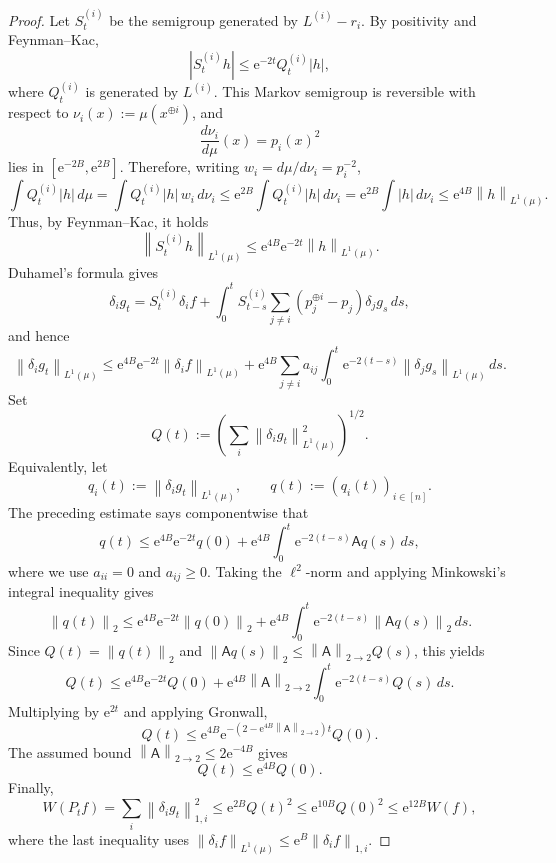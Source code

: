 \documentclass[11pt]{article}
\theoremstyle{plain}
\theoremstyle{definition}
\theoremstyle{remark}
\newcommand{\norm}[1]{\left\lVert #1 \right\rVert}
\newcommand{\e}{\mathrm{e}}
\newcommand{\tuple}[1]{\left(#1\right)}
\newcommand{\tp}{\tuple}
\begin{document}
\begin{proof}
Let \(S_t^{(i)}\) be the semigroup generated by \(L^{(i)}-r_i\).  By
positivity and Feynman--Kac,
\[
    |S_t^{(i)}h|\le \e^{-2t}Q_t^{(i)}|h|,
\]
where \(Q_t^{(i)}\) is generated by \(L^{(i)}\).  This Markov semigroup is
reversible with respect to \(\nu_i(x):=\mu(x^{\oplus i})\), and
\[
    \frac{d\nu_i}{d\mu}(x)=p_i(x)^2
\]
lies in \([\e^{-2B},\e^{2B}]\).  Therefore, writing
\(w_i=d\mu/d\nu_i=p_i^{-2}\),
\[
    \int Q_t^{(i)}|h|\,d\mu
    =
    \int Q_t^{(i)}|h|\, w_i\,d\nu_i
    \le
    \e^{2B}\int Q_t^{(i)}|h|\,d\nu_i
    =
    \e^{2B}\int |h|\,d\nu_i
    \le
    \e^{4B}\norm{h}_{L^1(\mu)}.
\]
Thus, by Feynman--Kac, it holds
\[
    \norm{S_t^{(i)}h}_{L^1(\mu)}
    \le \e^{4B}\e^{-2t}\norm{h}_{L^1(\mu)}.
\]
Duhamel's formula gives
\[
    \delta_i g_t
    =
    S_t^{(i)}\delta_i f
    +
    \int_0^t
    S_{t-s}^{(i)}
    \sum_{j\ne i}(p_j^{\oplus i}-p_j)\delta_jg_s\,ds,
\]
and hence
\[
    \norm{\delta_i g_t}_{L^1(\mu)}
    \le
    \e^{4B}\e^{-2t}\norm{\delta_i f}_{L^1(\mu)}
    +
    \e^{4B}\sum_{j\ne i}a_{ij}
    \int_0^t\e^{-2(t-s)}\norm{\delta_jg_s}_{L^1(\mu)}\,ds.
\]
Set
\[
    Q(t):=\tp{\sum_i\norm{\delta_i g_t}_{L^1(\mu)}^2}^{1/2}.
\]
Equivalently, let
\[
    q_i(t):=\norm{\delta_i g_t}_{L^1(\mu)},
    \qquad
    q(t):=(q_i(t))_{i\in[n]}.
\]
The preceding estimate says componentwise that
\[
    q(t)
    \le
    \e^{4B}\e^{-2t}q(0)
    +
    \e^{4B}\int_0^t\e^{-2(t-s)}\mathsf A q(s)\,ds,
\]
where we use \(a_{ii}=0\) and \(a_{ij}\ge0\).  Taking the \(\ell^2\)-norm
and applying Minkowski's integral inequality gives
\[
    \norm{q(t)}_2
    \le
    \e^{4B}\e^{-2t}\norm{q(0)}_2
    +
    \e^{4B}\int_0^t\e^{-2(t-s)}
    \norm{\mathsf A q(s)}_2\,ds.
\]
Since \(Q(t)=\norm{q(t)}_2\) and
\(\norm{\mathsf A q(s)}_2\le\norm{\mathsf A}_{2\to2}Q(s)\), this yields
\[
    Q(t)
    \le
    \e^{4B}\e^{-2t}Q(0)
    +
    \e^{4B}\norm{\mathsf A}_{2\to2}
    \int_0^t\e^{-2(t-s)}Q(s)\,ds.
\]
Multiplying by \(\e^{2t}\) and applying Gronwall,
\[
    Q(t)
    \le
    \e^{4B}
    \e^{-(2-\e^{4B}\norm{\mathsf A}_{2\to2})t}Q(0).
\]
The assumed bound \(\norm{\mathsf A}_{2\to2}\le2\e^{-4B}\) gives
\[
    Q(t)\le \e^{4B}Q(0).
\]
Finally,
\[
    W(P_t f)
    =
    \sum_i\norm{\delta_i g_t}_{1,i}^2
    \le
    \e^{2B}Q(t)^2
    \le
    \e^{10B}Q(0)^2
    \le
    \e^{12B}W(f),
\]
where the last inequality uses
\(\norm{\delta_i f}_{L^1(\mu)}\le\e^B\norm{\delta_i f}_{1,i}\).
\end{proof}
\end{document}
